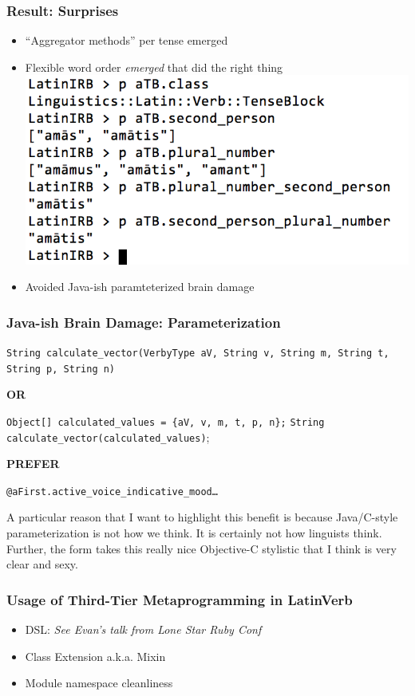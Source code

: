 \documentclass[slidestop,compress,mathserif]{beamer}
\begin{document}
\begin{frame}
	\frametitle{Result:  Surprises}
	\begin{itemize}
		\item ``Aggregator methods'' per tense emerged
		\item Flexible word order \emph{emerged} that did the right thing
		\includegraphics[scale=0.38]{img/conj_subspec.png}
		\pause
		\item Avoided Java-ish paramteterized brain damage
	\end{itemize}
\end{frame}


\begin{frame}
	\frametitle{Java-ish Brain Damage:  Parameterization}
 	\texttt{String calculate\_vector(VerbyType aV, String v, String m, String t, String p, String n)}
	\vskip 0.5cm

	\begin{center}
		\textbf{OR}
	\end{center}

	\vskip 0.5cm
	\texttt{Object[] calculated\_values = \{aV, v, m, t, p, n\};}
	\texttt{String calculate\_vector(calculated\_values)};
	\vskip 0.5cm

	\begin{center}
		\textbf{PREFER}
	\end{center}

	\vskip 0.5cm
	\texttt{@aFirst.active\_voice\_indicative\_mood{\ldots}}
\end{frame}
\note
{A particular reason that I want to highlight this benefit is because
Java/C-style parameterization is not how we think. It is certainly not how
linguists think. Further, the form takes this really nice Objective-C
stylistic that I think is very clear and sexy.
}

\begin{frame}
	\frametitle{Usage of Third-Tier Metaprogramming in LatinVerb}
	\begin{itemize}
		\item DSL:  \emph{See Evan's talk from Lone Star Ruby Conf}
		\item Class Extension a.k.a. Mixin
		\item Module namespace cleanliness
	\end{itemize}
\end{frame}
\end{document}
